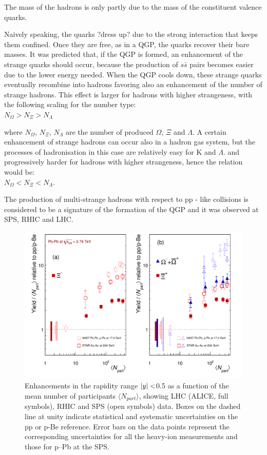 The mass of the hadrons is only partly due to the mass of the constituent valence quarks.

 Naively speaking, the quarks ?dress up? due to the strong interaction that keeps them confined. Once they are free, as in a QGP, the quarks recover their bare masses. It was predicted that, if the QGP is formed, an enhancement of the strange quarks should occur, because the production of $s\bar{s}$ pairs becomes easier due to the lower energy needed. When the QGP cools down, these strange quarks eventually recombine into hadrons favoring also an enhancement of the number of strange hadrons. This effect is larger for hadrons with higher strangeness, with the following scaling for the number type: \\

$N_{\Omega} >  N_{\Xi} > N_{\Lambda}$

where $N_{\Omega}$, $N_{\Xi}$, $N_{\Lambda}$ are the number of produced $\Omega$, $\Xi$ and $\Lambda$. A certain enhancement of strange hadrons can occur also in a hadron gas system, but the processes of hadronisation in this case are relatively easy for K and  $\Lambda$. and progressively harder for hadrons with higher strangeness, hence the relation would be: \\

$N_{\Omega} <  N_{\Xi} < N_{\Lambda}$.

The production of multi-strange hadrons with respect to pp - like collisions is considered to be a signature of the formation of the QGP and it was observed at SPS, RHIC and LHC. \cite{cite:strangePbPb}


\begin{figure}[htbp]
\begin{center}
\includegraphics[width=12.cm]{./Version1/FigChapter3/MultdNdy}
\caption{Enhancements in the rapidity range  $\arrowvert y \arrowvert<$0.5 as a function of the mean number of participants  $\langle N_{part}\rangle$, showing LHC (ALICE, full symbols), RHIC and SPS (open symbols) data. Boxes on the dashed line at unity indicate statistical and systematic uncertainties on the pp or p-Be reference. Error bars on the data points represent the corresponding uncertainties for all the heavy-ion measurements and those for p--Pb at the SPS. }
\label{fig:dNdy}
\end{center}
\end{figure}


